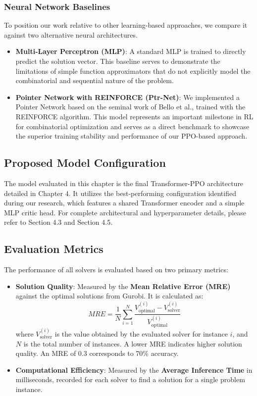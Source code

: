 \subsubsection{Neural Network Baselines}
To position our work relative to other learning-based approaches, we compare it against two alternative neural architectures.
\begin{itemize}
    \item \textbf{Multi-Layer Perceptron (MLP)}: A standard MLP is trained to directly predict the solution vector. This baseline serves to demonstrate the limitations of simple function approximators that do not explicitly model the combinatorial and sequential nature of the problem.
    \item \textbf{Pointer Network with REINFORCE (Ptr-Net)}: We implemented a Pointer Network based on the seminal work of Bello et al., trained with the REINFORCE algorithm. This model represents an important milestone in RL for combinatorial optimization and serves as a direct benchmark to showcase the superior training stability and performance of our PPO-based approach.
\end{itemize}

\subsection{Proposed Model Configuration}
The model evaluated in this chapter is the final Transformer-PPO architecture detailed in Chapter 4. It utilizes the best-performing configuration identified during our research, which features a shared Transformer encoder and a simple MLP critic head. For complete architectural and hyperparameter details, please refer to Section 4.3 and Section 4.5.

\subsection{Evaluation Metrics}
The performance of all solvers is evaluated based on two primary metrics:
\begin{itemize}
    \item \textbf{Solution Quality}: Measured by the \textbf{Mean Relative Error (MRE)} against the optimal solutions from Gurobi. It is calculated as:
    $$MRE = \frac{1}{N} \sum_{i=1}^{N} \frac{V_{\text{optimal}}^{(i)} - V_{\text{solver}}^{(i)}}{V_{\text{optimal}}^{(i)}}$$
    where $V_{\text{solver}}^{(i)}$ is the value obtained by the evaluated solver for instance $i$, and $N$ is the total number of instances. A lower MRE indicates higher solution quality. An MRE of 0.3 corresponds to 70\% accuracy.
    \item \textbf{Computational Efficiency}: Measured by the \textbf{Average Inference Time} in milliseconds, recorded for each solver to find a solution for a single problem instance.
\end{itemize}

